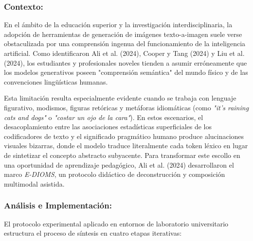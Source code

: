 \subsubsection*{Contexto:}
En el ámbito de la educación superior y la investigación interdisciplinaria, la adopción de herramientas de generación de imágenes texto-a-imagen suele verse obstaculizada por una comprensión ingenua del funcionamiento de la inteligencia artificial. Como identificaron Ali et al. (2024), Cooper y Tang (2024) y Liu et al. (2024), los estudiantes y profesionales noveles tienden a asumir erróneamente que los modelos generativos poseen "comprensión semántica" del mundo físico y de las convenciones lingüísticas humanas.

Esta limitación resulta especialmente evidente cuando se trabaja con lenguaje figurativo, modismos, figuras retóricas y metáforas idiomáticas (como \textit{"it's raining cats and dogs"} o \textit{"costar un ojo de la cara"}). En estos escenarios, el desacoplamiento entre las asociaciones estadísticas superficiales de los codificadores de texto y el significado pragmático humano produce alucinaciones visuales bizarras, donde el modelo traduce literalmente cada token léxico en lugar de sintetizar el concepto abstracto subyacente. Para transformar este escollo en una oportunidad de aprendizaje pedagógico, Ali et al. (2024) desarrollaron el marco \textit{E-DIOMS}, un protocolo didáctico de deconstrucción y composición multimodal asistida.

\subsubsection*{Análisis e Implementación:}
El protocolo experimental aplicado en entornos de laboratorio universitario estructura el proceso de síntesis en cuatro etapas iterativas:

